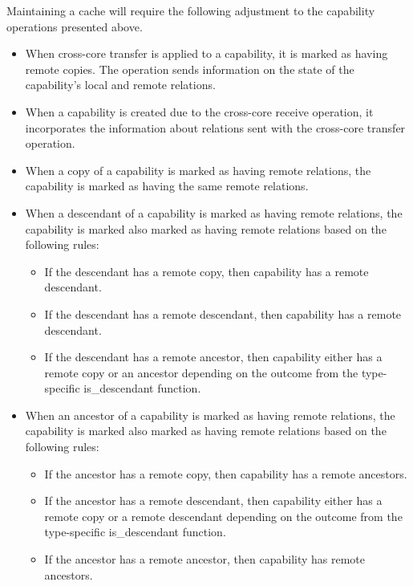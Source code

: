 \documentclass[a4paper,twoside]{report} %
\begin{document}
Maintaining a cache will require the following adjustment to the
capability operations presented above.

\begin{itemize}
\item When cross-core transfer is applied to a capability, it is
  marked as having remote copies. The operation sends information on
  the state of the capability's local and remote relations.

\item When a capability is created due to the cross-core receive
  operation, it incorporates the information about relations sent with
  the cross-core transfer operation.

\item When a copy of a capability is marked as having remote
  relations, the capability is marked as having the same remote
  relations.

\item When a descendant of a capability is marked as having remote
  relations, the capability is marked also marked as having remote
  relations based on the following rules:
  \begin{itemize}
  \item If the descendant has a remote copy, then capability has a
    remote descendant.
  \item If the descendant has a remote descendant, then capability has
    a remote descendant.
  \item If the descendant has a remote ancestor, then capability
    either has a remote copy or an ancestor depending on the outcome
    from the type-specific is\_descendant function.
  \end{itemize}

\item When an ancestor of a capability is marked as having remote
  relations, the capability is marked also marked as having remote
  relations based on the following rules:
  \begin{itemize}
  \item If the ancestor has a remote copy, then capability has a
    remote ancestors.
  \item If the ancestor has a remote descendant, then capability
    either has a remote copy or a remote descendant depending on the
    outcome from the type-specific is\_descendant function.
  \item If the ancestor has a remote ancestor, then capability
    has remote ancestors.
  \end{itemize}


\end{itemize}
\end{document}
